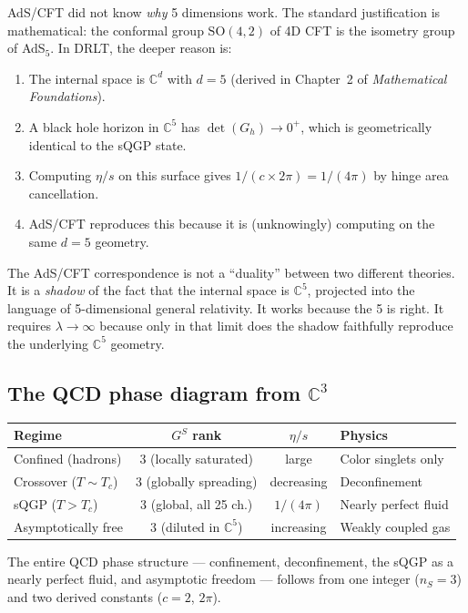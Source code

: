 \documentclass[12pt]{article}
\theoremstyle{remark}
\theoremstyle{definition}
\newcommand{\CC}{\mathbb{C}}
\begin{document}
AdS/CFT did not know \emph{why} 5 dimensions work. The standard justification is mathematical: the conformal group $\text{SO}(4,2)$ of 4D CFT is the isometry group of AdS$_5$. In DRLT, the deeper reason is:

\begin{enumerate}
\item The internal space is $\CC^d$ with $d = 5$ (derived in Chapter~2 of \textit{Mathematical Foundations}).
\item A black hole horizon in $\CC^5$ has $\det(G_h) \to 0^+$, which is geometrically identical to the sQGP state.
\item Computing $\eta/s$ on this surface gives $1/(c \times 2\pi) = 1/(4\pi)$ by hinge area cancellation.
\item AdS/CFT reproduces this because it is (unknowingly) computing on the same $d = 5$ geometry.
\end{enumerate}

The AdS/CFT correspondence is not a ``duality'' between two different theories. It is a \emph{shadow} of the fact that the internal space is $\CC^5$, projected into the language of 5-dimensional general relativity. It works because the 5 is right. It requires $\lambda \to \infty$ because only in that limit does the shadow faithfully reproduce the underlying $\CC^5$ geometry.

\subsection{The QCD phase diagram from $\CC^3$}

\begin{center}
\begin{tabular}{lccl}
\hline
Regime & $G^S$ rank & $\eta/s$ & Physics \\
\hline
Confined (hadrons) & 3 (locally saturated) & large & Color singlets only \\
Crossover ($T \sim T_c$) & 3 (globally spreading) & decreasing & Deconfinement \\
sQGP ($T > T_c$) & 3 (global, all 25 ch.) & $1/(4\pi)$ & Nearly perfect fluid \\
Asymptotically free & 3 (diluted in $\CC^5$) & increasing & Weakly coupled gas \\
\hline
\end{tabular}
\end{center}

The entire QCD phase structure --- confinement, deconfinement, the sQGP as a nearly perfect fluid, and asymptotic freedom --- follows from one integer ($n_S = 3$) and two derived constants ($c = 2$, $2\pi$).
\end{document}
